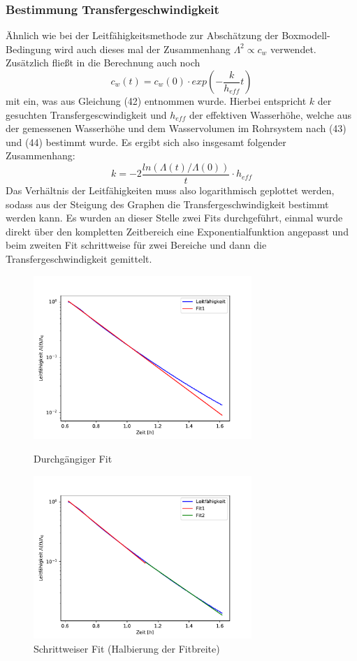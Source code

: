 \documentclass[12pt]{article}
\begin{document}
\subsubsection{Bestimmung Transfergeschwindigkeit}

Ähnlich wie bei der Leitfähigkeitsmethode zur Abschätzung der Boxmodell-Bedingung wird auch dieses mal der Zusammenhang $\Lambda ^2 \propto c_w $ verwendet. Zusätzlich fließt in die Berechnung auch noch
\begin{equation}
c_w(t) = c_w(0) \cdot exp(-\frac{k}{h_{eff}}t)
\end{equation}
mit ein, was aus Gleichung (42) \cite{jaehne} entnommen wurde. Hierbei entspricht $k$ der gesuchten Transfergescwindigkeit und $h_{eff}$ der effektiven Wasserhöhe, welche aus der gemessenen Wasserhöhe und dem Wasservolumen im Rohrsystem nach (43) und (44) \cite{jaehne} bestimmt wurde. Es ergibt sich also insgesamt folgender Zusammenhang:
\begin{equation}
k = -2 \frac{ln(\Lambda (t)/\Lambda (0))}{t} \cdot h_{eff}
\end{equation}
Das Verhältnis der Leitfähigkeiten muss also logarithmisch geplottet werden, sodass aus der Steigung des Graphen die Transfergeschwindigkeit bestimmt werden kann. Es wurden an dieser Stelle zwei Fits durchgeführt, einmal wurde direkt über den kompletten Zeitbereich eine Exponentialfunktion angepasst und beim zweiten Fit schrittweise für zwei Bereiche und dann die Transfergeschwindigkeit gemittelt.

\begin{figure}[H]
	\centering
	\parbox{82.5mm}{
		\centering
		\includegraphics[width=82.5mm]{VE-Wasser/TransferGeschw}
		\caption{Durchgängiger Fit}
	}
	\hfill%
	\parbox{82.5mm}{
		\centering
		\includegraphics[width=82.5mm]{VE-Wasser/TransferGeschwKnick}
		\caption{Schrittweiser Fit (Halbierung der Fitbreite)}
	}
\end{figure}
\end{document}
